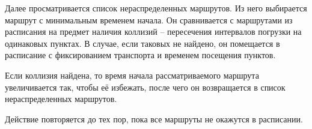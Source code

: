 Далее просматривается список нераспределенных маршрутов. Из него выбирается маршрут с минимальным временем начала. Он сравнивается с маршрутами из расписания на предмет наличия коллизий -- пересечения интервалов погрузки на одинаковых пунктах. В случае, если таковых не найдено, он помещается в расписание с фиксированием транспорта и временем посещения пунктов. 

Если коллизия найдена, то время начала рассматриваемого маршрута увеличивается так, чтобы её избежать, после чего он возвращается в список нераспределенных маршрутов. 

Действие повторяется до тех пор, пока все маршруты не окажутся в расписании.

\pagebreak